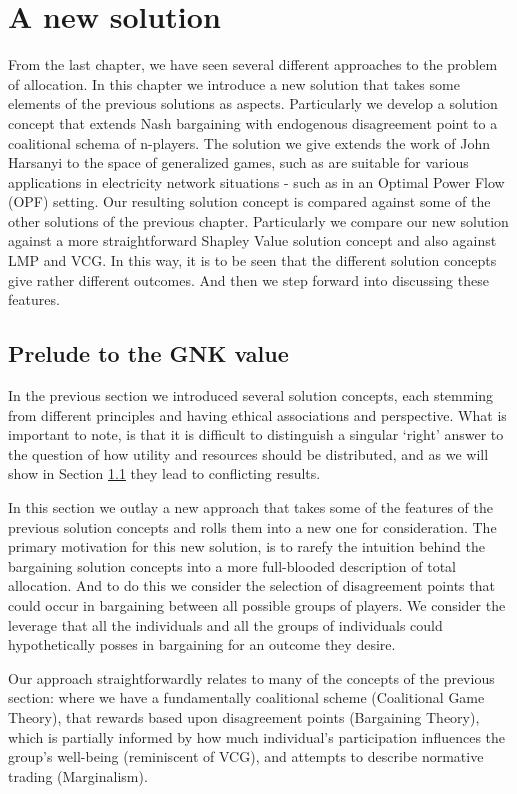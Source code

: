 \chapter{A new solution}
\label{cha:new_solution}

From the last chapter, we have seen several different approaches to the problem of allocation.
In this chapter we introduce a new solution that takes some elements of the previous solutions as aspects.
Particularly we develop a solution concept that extends Nash bargaining with endogenous disagreement point to a coalitional schema of n-players.
The solution we give extends the work of John Harsanyi to the space of generalized games, such as are suitable for various applications in electricity network situations - such as in an Optimal Power Flow (OPF) setting.
Our resulting solution concept is compared against some of the other solutions of the previous chapter. Particularly we compare our new solution against a more straightforward Shapley Value solution concept and also against LMP and VCG.
In this way, it is to be seen that the different solution concepts give rather different outcomes.
And then we step forward into discussing these features.


\section{Prelude to the GNK value}

In the previous section we introduced several solution concepts, each stemming from different principles and having ethical associations and perspective.
What is important to note, is that it is difficult to distinguish a singular `right' answer to the question of how utility and resources should be distributed, and as we will show in Section \ref{} they lead to conflicting results.

In this section we outlay a new approach that takes some of the features of the previous solution concepts and rolls them into a new one for consideration.
The primary motivation for this new solution, is to rarefy the intuition behind the bargaining solution concepts into a more full-blooded description of total allocation.
And to do this we consider the selection of disagreement points that could occur in bargaining between all possible groups of players.
We consider the leverage that all the individuals and all the groups of individuals could hypothetically posses in bargaining for an outcome they desire.

Our approach straightforwardly relates to many of the concepts of the previous section: where we have a fundamentally coalitional scheme (Coalitional Game Theory), that rewards based upon disagreement points (Bargaining Theory), which is partially informed by how much individual's participation influences the group's well-being (reminiscent of VCG), and attempts to describe normative trading (Marginalism).


